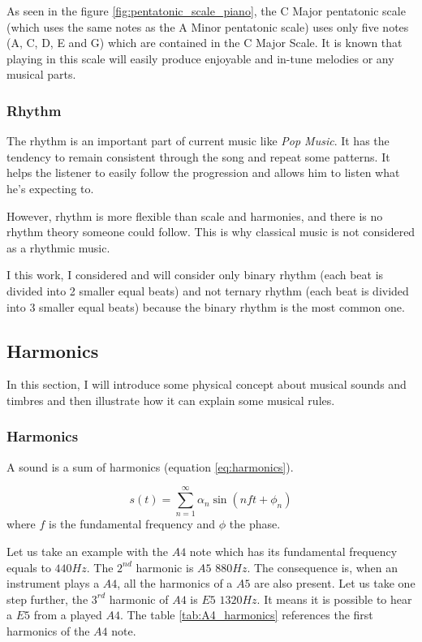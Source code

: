 \documentclass[12pt]{report}
\begin{document}
As seen in the figure \ref{fig:pentatonic_scale_piano}, the C Major pentatonic scale (which uses the same notes as the A Minor pentatonic scale) uses only five notes (A, C, D, E and G) which are contained in the C Major Scale.
It is known that playing in this scale will easily produce enjoyable and in-tune melodies or any musical parts.


\subsubsection{Rhythm}

The rhythm is an important part of current music like \textit{Pop Music}.
It has the tendency to remain consistent through the song and repeat some patterns.
It helps the listener to easily follow the progression and allows him to listen what he's expecting to.

However, rhythm is more flexible than scale and harmonies, and there is no rhythm theory someone could follow.
This is why classical music is not considered as a rhythmic music.

I this work, I considered and will consider only binary rhythm (each beat is divided into 2 smaller equal beats) and not ternary rhythm (each beat is divided into 3 smaller equal beats) because the binary rhythm is the most common one.


\subsection{Harmonics}
\label{sec:harmonics}

In this section, I will introduce some physical concept about musical sounds and timbres and then illustrate how it can explain some musical rules.

\subsubsection{Harmonics}

A sound is a sum of harmonics (equation \ref{eq:harmonics}).

\begin{equation}
    s(t) = \sum_{n=1}^{\infty} \alpha_{n} \sin(n f t + \phi_{n})
    \label{eq:harmonics}
\end{equation}
where $f$ is the fundamental frequency and $\phi$ the phase.

Let us take an example with the $A4$ note which has its fundamental frequency equals to $440 Hz$.
The $2^{nd}$ harmonic is $A5$ $880Hz$.
The consequence is, when an instrument plays a $A4$, all the harmonics of a $A5$ are also present.
Let us take one step further, the $3^{rd}$ harmonic of $A4$ is $E5$ $1320Hz$.
It means it is possible to hear a $E5$ from a played $A4$.
The table \ref{tab:A4_harmonics} references the first harmonics of the $A4$ note.
\end{document}
